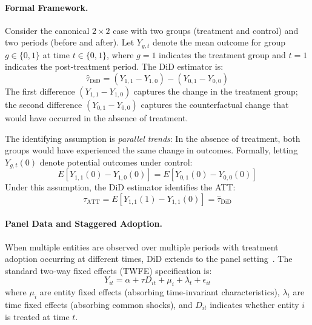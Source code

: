 \paragraph{Formal Framework.}
Consider the canonical $2 \times 2$ case with two groups (treatment and control) and two periods (before and after).
Let $Y_{g,t}$ denote the mean outcome for group $g \in \{0, 1\}$ at time $t \in \{0, 1\}$, where $g = 1$ indicates the treatment group and $t = 1$ indicates the post-treatment period.
The DiD estimator is:
\begin{equation}
    \widehat{\tau}_{\text{DiD}} = (Y_{1,1} - Y_{1,0}) - (Y_{0,1} - Y_{0,0})
\end{equation}
The first difference $(Y_{1,1} - Y_{1,0})$ captures the change in the treatment group; the second difference $(Y_{0,1} - Y_{0,0})$ captures the counterfactual change that would have occurred in the absence of treatment.

The identifying assumption is \emph{parallel trends}: In the absence of treatment, both groups would have experienced the same change in outcomes.
Formally, letting $Y_{g,t}(0)$ denote potential outcomes under control:
\begin{equation}
    E[Y_{1,1}(0) - Y_{1,0}(0)] = E[Y_{0,1}(0) - Y_{0,0}(0)]
\end{equation}
Under this assumption, the DiD estimator identifies the ATT:
\begin{equation}
    \tau_{\text{ATT}} = E[Y_{1,1}(1) - Y_{1,1}(0)] = \widehat{\tau}_{\text{DiD}}
\end{equation}

\paragraph{Panel Data and Staggered Adoption.}
When multiple entities are observed over multiple periods with treatment adoption occurring at different times, DiD extends to the panel setting~\cite{athey2022design}.
The standard two-way fixed effects (TWFE) specification is:
\begin{equation}
\label{eq:chap2-base-did}
    Y_{it} = \alpha + \tau D_{it} + \mu_i + \lambda_t + \epsilon_{it}
\end{equation}
where $\mu_i$ are entity fixed effects (absorbing time-invariant characteristics), $\lambda_t$ are time fixed effects (absorbing common shocks), and $D_{it}$ indicates whether entity $i$ is treated at time $t$.

